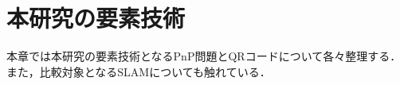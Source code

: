\chapter{本研究の要素技術}
\label{element}

本章では本研究の要素技術となるPnP問題とQRコードについて各々整理する．
また，比較対象となるSLAMについても触れている．




